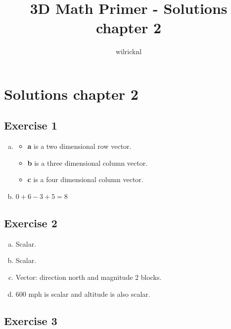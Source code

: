 \documentclass[11pt]{article}
\author{wilricknl}
\title{3D Math Primer - Solutions chapter 2}
\begin{document}
\maketitle

\section{Solutions chapter 2}

\subsection{Exercise 1}

\begin{enumerate}[a.]
    \item
    \begin{itemize}
        \item \textbf{a} is a two dimensional row vector.
        \item \textbf{b} is a three dimensional column vector.
        \item \textbf{c} is a four dimensional column vector.
    \end{itemize}
    \item $0 + 6 - 3 + 5 = 8$
\end{enumerate}

\subsection{Exercise 2}

\begin{enumerate}[a.]
	\item Scalar.
	\item Scalar.
	\item Vector: direction north and magnitude 2 blocks.
	\item 600 mph is scalar and altitude is also scalar.
\end{enumerate}


\subsection{Exercise 3}
\end{document}
